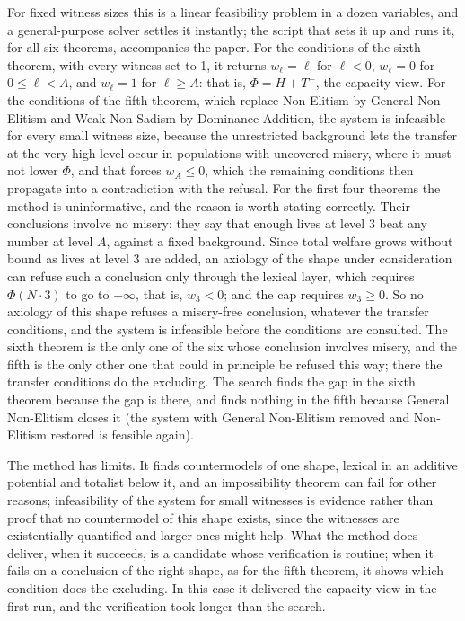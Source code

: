 \documentclass[
  11pt,
  letterpaper,
  DIV=11,
  numbers=noendperiod,
  twoside]{scrartcl}
\begin{document}
For fixed witness sizes this is a linear feasibility problem in a dozen
variables, and a general-purpose solver settles it instantly; the script
that sets it up and runs it, for all six theorems, accompanies the
paper. For the conditions of the sixth theorem, with every witness set
to 1, it returns \(w_\ell = \ell\) for \(\ell < 0\), \(w_\ell = 0\) for
\(0 \leq \ell < A\), and \(w_\ell = 1\) for \(\ell \geq A\): that is,
\(\Phi = H + T^-\), the capacity view. For the conditions of the fifth
theorem, which replace Non-Elitism by General Non-Elitism and Weak
Non-Sadism by Dominance Addition, the system is infeasible for every
small witness size, because the unrestricted background lets the
transfer at the very high level occur in populations with uncovered
misery, where it must not lower \(\Phi\), and that forces
\(w_A \leq 0\), which the remaining conditions then propagate into a
contradiction with the refusal. For the first four theorems the method
is uninformative, and the reason is worth stating correctly. Their
conclusions involve no misery: they say that enough lives at level 3
beat any number at level \(A\), against a fixed background. Since total
welfare grows without bound as lives at level 3 are added, an axiology
of the shape under consideration can refuse such a conclusion only
through the lexical layer, which requires \(\Phi(N \cdot 3)\) to go to
\(-\infty\), that is, \(w_3 < 0\); and the cap requires \(w_3 \geq 0\).
So no axiology of this shape refuses a misery-free conclusion, whatever
the transfer conditions, and the system is infeasible before the
conditions are consulted. The sixth theorem is the only one of the six
whose conclusion involves misery, and the fifth is the only other one
that could in principle be refused this way; there the transfer
conditions do the excluding. The search finds the gap in the sixth
theorem because the gap is there, and finds nothing in the fifth because
General Non-Elitism closes it (the system with General Non-Elitism
removed and Non-Elitism restored is feasible again).

The method has limits. It finds countermodels of one shape, lexical in
an additive potential and totalist below it, and an impossibility
theorem can fail for other reasons; infeasibility of the system for
small witnesses is evidence rather than proof that no countermodel of
this shape exists, since the witnesses are existentially quantified and
larger ones might help. What the method does deliver, when it succeeds,
is a candidate whose verification is routine; when it fails on a
conclusion of the right shape, as for the fifth theorem, it shows which
condition does the excluding. In this case it delivered the capacity
view in the first run, and the verification took longer than the search.
\end{document}
